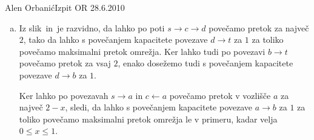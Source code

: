 \begin{naloga}{Alen Orbanić}{Izpit OR 28.6.2010}
\begin{odgovor}
\begin{enumerate}[(a)]
\item Iz slik~ in~ je razvidno,
da lahko po poti $s \to c \to d$ povečamo pretok za največ $2$,
tako da lahko s povečanjem kapacitete povezave $d \to t$ za $1$
za toliko povečamo maksimalni pretok omrežja.
Ker lahko tudi po povezavi $b \to t$ povečamo pretok za vsaj $2$,
enako dosežemo tudi s povečanjem kapacitete povezave $d \to b$ za $1$.

Ker lahko po povezavah $s \to a$ in $c \gets a$
povečamo pretok v vozlišče $a$ za največ $2-x$,
sledi, da lahko s povečanjem kapacitete povezave $a \to b$ za $1$
za toliko povečamo maksimalni pretok omrežja le v primeru,
kadar velja $0 \le x \le 1$.
\end{enumerate}

\begin{slika}
\end{slika}
\begin{slika}
\end{slika}
\begin{slika}
\end{slika}
\end{odgovor}
\end{naloga}
